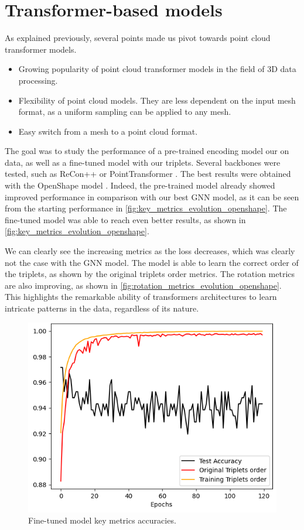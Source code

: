 \section{Transformer-based models}
\label{sec:transformer-based-models}

As explained previously, several points made us pivot towards point cloud transformer models.
\begin{itemize}
    \item Growing popularity of point cloud transformer models in the field of 3D data processing.
    \item Flexibility of point cloud models. They are less dependent on the input mesh format, as a uniform sampling can be applied to any mesh.
    \item Easy switch from a mesh to a point cloud format.
\end{itemize}

The goal was to study the performance of a pre-trained encoding model our on data, as well as a fine-tuned model with our triplets. Several backbones were tested, such as ReCon++ \cite{qiShapeLLMUniversal3D2024} or PointTransformer \cite{zhaoPointTransformer2021}. The best results were obtained with the OpenShape model \cite{liuOpenShapeScaling3D2023}. Indeed, the pre-trained model already showed improved performance in comparison with our best GNN model, as it can be seen from the starting performance in \autoref{fig:key_metrics_evolution_openshape}. The fine-tuned model was able to reach even better results, as shown in \autoref{fig:key_metrics_evolution_openshape}.

We can clearly see the increasing metrics as the loss decreases, which was clearly not the case with the GNN model. The model is able to learn the correct order of the triplets, as shown by the original triplets order metrics. The rotation metrics are also improving, as shown in \autoref{fig:rotation_metrics_evolution_openshape}.
This highlights the remarkable ability of transformers architectures to learn intricate patterns in the data, regardless of its nature.

\begin{figure}[]
    \centering
    \includegraphics[width=0.5\columnwidth]{images/key_metrics_evolution_openshape.png}
    \caption{Fine-tuned model key metrics accuracies.}
    \label{fig:key_metrics_evolution_openshape}
\end{figure}

